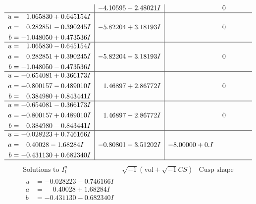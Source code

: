 \documentclass[1p]{elsarticle_modified}
\theoremstyle{definition}
\newcommand{\I}{\sqrt{-1}}
\begin{document}
$$\begin{array}{c|c|c}
 & -4.10595 - 2.48021 I & \phantom{-0.000000 } 0 \\ \hline\begin{aligned}
u &= \phantom{-}1.065830 + 0.645154 I \\
a &= \phantom{-}0.282851 - 0.390245 I \\
b &= -1.048050 + 0.473536 I\end{aligned}
 & -5.82204 + 3.18193 I & \phantom{-0.000000 } 0 \\ \hline\begin{aligned}
u &= \phantom{-}1.065830 - 0.645154 I \\
a &= \phantom{-}0.282851 + 0.390245 I \\
b &= -1.048050 - 0.473536 I\end{aligned}
 & -5.82204 - 3.18193 I & \phantom{-0.000000 } 0 \\ \hline\begin{aligned}
u &= -0.654081 + 0.366173 I \\
a &= -0.800157 - 0.489010 I \\
b &= \phantom{-}0.384980 + 0.843441 I\end{aligned}
 & \phantom{-}1.46897 + 2.86772 I & \phantom{-0.000000 } 0 \\ \hline\begin{aligned}
u &= -0.654081 - 0.366173 I \\
a &= -0.800157 + 0.489010 I \\
b &= \phantom{-}0.384980 - 0.843441 I\end{aligned}
 & \phantom{-}1.46897 - 2.86772 I & \phantom{-0.000000 } 0 \\ \hline\begin{aligned}
u &= -0.028223 + 0.746166 I \\
a &= \phantom{-}0.40028 - 1.68284 I \\
b &= -0.431130 + 0.682340 I\end{aligned}
 & -0.80801 - 3.51202 I & -8.00000 + 0. I\phantom{ +0.000000I}\\
 \hline 
 \end{array}$$\newpage$$\begin{array}{c|c|c}  
\text{Solutions to }I^u_{1}& \I (\text{vol} + \sqrt{-1}CS) & \text{Cusp shape}\\
 \hline 
\begin{aligned}
u &= -0.028223 - 0.746166 I \\
a &= \phantom{-}0.40028 + 1.68284 I \\
b &= -0.431130 - 0.682340 I\end{aligned}

\end{array}$$
\end{document}
